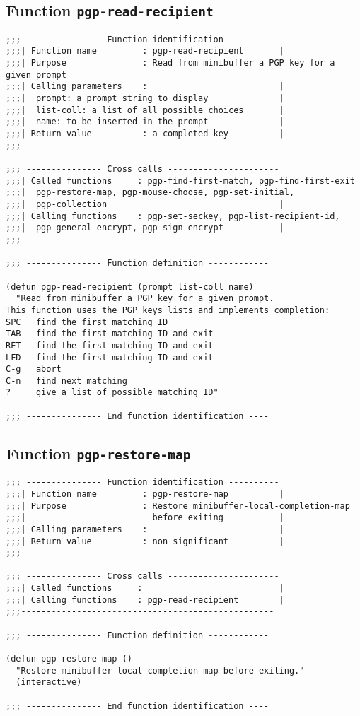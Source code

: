 \subsection{Function {\tt pgp-read-recipient}}
\leavevmode
\begin{verbatim}
;;; --------------- Function identification ----------
;;;| Function name         : pgp-read-recipient       |
;;;| Purpose               : Read from minibuffer a PGP key for a given prompt
;;;| Calling parameters    :                          |
;;;|  prompt: a prompt string to display              |
;;;|  list-coll: a list of all possible choices       |
;;;|  name: to be inserted in the prompt              |
;;;| Return value          : a completed key          |
;;;--------------------------------------------------

;;; --------------- Cross calls ----------------------
;;;| Called functions     : pgp-find-first-match, pgp-find-first-exit
;;;|  pgp-restore-map, pgp-mouse-choose, pgp-set-initial,
;;;|  pgp-collection                                  |
;;;| Calling functions    : pgp-set-seckey, pgp-list-recipient-id,
;;;|  pgp-general-encrypt, pgp-sign-encrypt           |
;;;--------------------------------------------------

;;; --------------- Function definition ------------

(defun pgp-read-recipient (prompt list-coll name)
  "Read from minibuffer a PGP key for a given prompt.
This function uses the PGP keys lists and implements completion:
SPC   find the first matching ID
TAB   find the first matching ID and exit
RET   find the first matching ID and exit
LFD   find the first matching ID and exit
C-g   abort
C-n   find next matching
?     give a list of possible matching ID"

;;; --------------- End function identification ----
\end{verbatim}
\subsection{Function {\tt pgp-restore-map}}
\leavevmode
\begin{verbatim}
;;; --------------- Function identification ----------
;;;| Function name         : pgp-restore-map          |
;;;| Purpose               : Restore minibuffer-local-completion-map
;;;|                         before exiting           |
;;;| Calling parameters    :                          |
;;;| Return value          : non significant          |
;;;--------------------------------------------------

;;; --------------- Cross calls ----------------------
;;;| Called functions     :                           |
;;;| Calling functions    : pgp-read-recipient        |
;;;--------------------------------------------------

;;; --------------- Function definition ------------

(defun pgp-restore-map ()
  "Restore minibuffer-local-completion-map before exiting."
  (interactive)

;;; --------------- End function identification ----
\end{verbatim}
